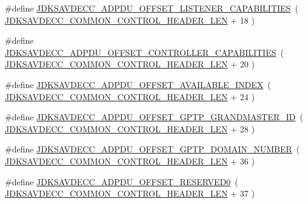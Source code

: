 \begin{DoxyCompactItemize}
\item 
\#define \hyperlink{group__adpdu_gad723cabe002e0a5c66d76701a84f1cd2}{J\+D\+K\+S\+A\+V\+D\+E\+C\+C\+\_\+\+A\+D\+P\+D\+U\+\_\+\+O\+F\+F\+S\+E\+T\+\_\+\+L\+I\+S\+T\+E\+N\+E\+R\+\_\+\+C\+A\+P\+A\+B\+I\+L\+I\+T\+I\+ES}~( \hyperlink{group__jdksavdecc__avtp__common__control__header_gaae84052886fb1bb42f3bc5f85b741dff}{J\+D\+K\+S\+A\+V\+D\+E\+C\+C\+\_\+\+C\+O\+M\+M\+O\+N\+\_\+\+C\+O\+N\+T\+R\+O\+L\+\_\+\+H\+E\+A\+D\+E\+R\+\_\+\+L\+EN} + 18 )
\item 
\#define \hyperlink{group__adpdu_ga3e47949e00143c3125bc88b85737656f}{J\+D\+K\+S\+A\+V\+D\+E\+C\+C\+\_\+\+A\+D\+P\+D\+U\+\_\+\+O\+F\+F\+S\+E\+T\+\_\+\+C\+O\+N\+T\+R\+O\+L\+L\+E\+R\+\_\+\+C\+A\+P\+A\+B\+I\+L\+I\+T\+I\+ES}~( \hyperlink{group__jdksavdecc__avtp__common__control__header_gaae84052886fb1bb42f3bc5f85b741dff}{J\+D\+K\+S\+A\+V\+D\+E\+C\+C\+\_\+\+C\+O\+M\+M\+O\+N\+\_\+\+C\+O\+N\+T\+R\+O\+L\+\_\+\+H\+E\+A\+D\+E\+R\+\_\+\+L\+EN} + 20 )
\item 
\#define \hyperlink{group__adpdu_gadeda106636710de28b55a76369c46bd9}{J\+D\+K\+S\+A\+V\+D\+E\+C\+C\+\_\+\+A\+D\+P\+D\+U\+\_\+\+O\+F\+F\+S\+E\+T\+\_\+\+A\+V\+A\+I\+L\+A\+B\+L\+E\+\_\+\+I\+N\+D\+EX}~( \hyperlink{group__jdksavdecc__avtp__common__control__header_gaae84052886fb1bb42f3bc5f85b741dff}{J\+D\+K\+S\+A\+V\+D\+E\+C\+C\+\_\+\+C\+O\+M\+M\+O\+N\+\_\+\+C\+O\+N\+T\+R\+O\+L\+\_\+\+H\+E\+A\+D\+E\+R\+\_\+\+L\+EN} + 24 )
\item 
\#define \hyperlink{group__adpdu_ga383e7da9e60bd4571e3b50d6e2fbdec2}{J\+D\+K\+S\+A\+V\+D\+E\+C\+C\+\_\+\+A\+D\+P\+D\+U\+\_\+\+O\+F\+F\+S\+E\+T\+\_\+\+G\+P\+T\+P\+\_\+\+G\+R\+A\+N\+D\+M\+A\+S\+T\+E\+R\+\_\+\+ID}~( \hyperlink{group__jdksavdecc__avtp__common__control__header_gaae84052886fb1bb42f3bc5f85b741dff}{J\+D\+K\+S\+A\+V\+D\+E\+C\+C\+\_\+\+C\+O\+M\+M\+O\+N\+\_\+\+C\+O\+N\+T\+R\+O\+L\+\_\+\+H\+E\+A\+D\+E\+R\+\_\+\+L\+EN} + 28 )
\item 
\#define \hyperlink{group__adpdu_ga13ca9d2d3a34745babd3110dbbe29840}{J\+D\+K\+S\+A\+V\+D\+E\+C\+C\+\_\+\+A\+D\+P\+D\+U\+\_\+\+O\+F\+F\+S\+E\+T\+\_\+\+G\+P\+T\+P\+\_\+\+D\+O\+M\+A\+I\+N\+\_\+\+N\+U\+M\+B\+ER}~( \hyperlink{group__jdksavdecc__avtp__common__control__header_gaae84052886fb1bb42f3bc5f85b741dff}{J\+D\+K\+S\+A\+V\+D\+E\+C\+C\+\_\+\+C\+O\+M\+M\+O\+N\+\_\+\+C\+O\+N\+T\+R\+O\+L\+\_\+\+H\+E\+A\+D\+E\+R\+\_\+\+L\+EN} + 36 )
\item 
\#define \hyperlink{group__adpdu_ga5bbc7f9b72282a7719abec43c1b1a70b}{J\+D\+K\+S\+A\+V\+D\+E\+C\+C\+\_\+\+A\+D\+P\+D\+U\+\_\+\+O\+F\+F\+S\+E\+T\+\_\+\+R\+E\+S\+E\+R\+V\+E\+D0}~( \hyperlink{group__jdksavdecc__avtp__common__control__header_gaae84052886fb1bb42f3bc5f85b741dff}{J\+D\+K\+S\+A\+V\+D\+E\+C\+C\+\_\+\+C\+O\+M\+M\+O\+N\+\_\+\+C\+O\+N\+T\+R\+O\+L\+\_\+\+H\+E\+A\+D\+E\+R\+\_\+\+L\+EN} + 37 )

\end{DoxyCompactItemize}
